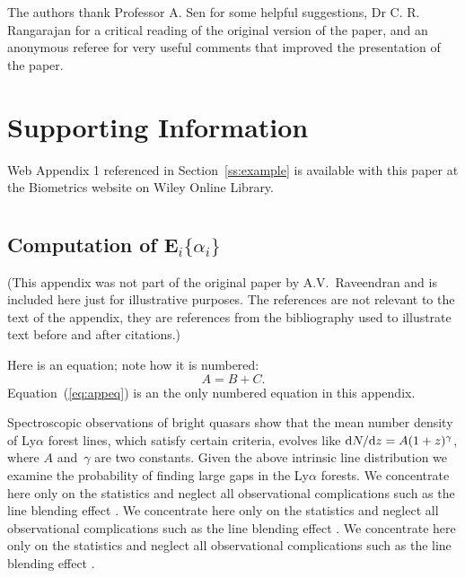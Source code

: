 \documentclass[useAMS,usenatbib, referree]{biom}
\begin{document}
The authors thank Professor A. Sen for some helpful suggestions,
Dr C. R. Rangarajan for a critical reading of the original version of the
paper, and an anonymous referee for very useful comments that improved
the presentation of the paper.\vspace*{-8pt}




 


\section*{Supporting Information}

Web Appendix 1 referenced in Section~\ref{ss:example} is available
with this paper at the Biometrics website on Wiley Online Library.
\vspace*{-8pt}

\appendix

\section{}
\subsection{Computation of E$_i\{\alpha_i\}$}

(This appendix was not part of the original paper by
A.V.~Raveendran and is included here just for illustrative
purposes. The references are not relevant to the text of the
appendix, they are references from the bibliography used to
illustrate text before and after citations.)

Here is an equation; note how it is numbered:
\begin{equation}
A = B+C. 
\label{eq:appeq}
\end{equation}
Equation~(\ref{eq:appeq}) is an the only numbered equation in this appendix.

Spectroscopic observations of bright quasars show that the mean
number density of Ly$\alpha$ forest lines, which satisfy certain
criteria, evolves like ${\mathrm{d}}N/{\mathrm{d}}z=A(1+z)^\gamma$, where
$A$ and~$\gamma$ are two constants.  Given the above intrinsic
line distribution we examine the probability of finding large gaps
in the Ly$\alpha$ forests.  We concentrate here only on the
statistics and neglect all observational complications such as the
line blending effect \citep[see][for example]{b11}. We concentrate here only on the
statistics and neglect all observational complications such as the
line blending effect \citep[see][for example]{b11}. We concentrate here only on the
statistics and neglect all observational complications such as the
line blending effect \citep[see][for example]{b11}. 
\end{document}
